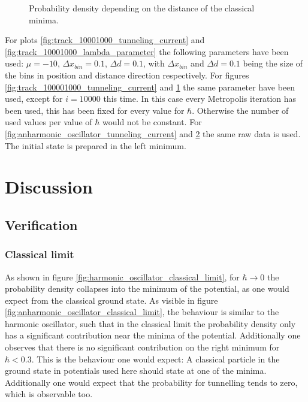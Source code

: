 \documentclass{scrartcl}
\begin{document}
\begin{figure}[H]
\begin{subfigure}[c]{0.49\textwidth}
					\label{fig:track_100001000_lambda_parameter}
				\end{subfigure}
			\caption{Probability density depending on the distance of the classical minima.}
			\label{fig:anharmonic_oscillator_lambda_parameter}
		\end{figure}
		For plots \ref{fig:track_10001000_tunneling_current} and \ref{fig:track_10001000_lambda_parameter} the following parameters have been used: $\mu = -10$, $\Delta x_{bin} = 0.1$, $\Delta d = 0.1$, with $\Delta x_{bin}$ and $\Delta d = 0.1$ being the size of the bins in position and distance direction respectively.
		For figures \ref{fig:track_100001000_tunneling_current} and \ref{fig:track_100001000_lambda_parameter} the same parameter have been used, except for $i = 10000$ this time.
		In this case every  Metropolis iteration has been used, this has been fixed for every value for $\hbar$.
		Otherwise the number of used values per value of $\hbar$ would not be constant.
		For \ref{fig:anharmonic_oscillator_tunneling_current} and \ref{fig:anharmonic_oscillator_lambda_parameter} the same raw data is used.
		The initial state is prepared in the left minimum.

	\section{Discussion}
	\subsection{Verification}
	\subsubsection{Classical limit}
		As shown in figure \ref{fig:harmonic_oscillator_classical_limit}, for $\hbar \rightarrow 0$ the probability density collapses into the minimum of the potential, as one would expect from the classical ground state.
		As visible in figure \ref{fig:anharmonic_oscillator_classical_limit}, the behaviour is similar to the harmonic oscillator, such that in the classical limit the probability density only has a significant contribution near the minima of the potential.
		Additionally one observes that there is no significant contribution on the right minimum for $\hbar < 0.3$.
		This is the behaviour one would expect:
		A classical particle in the ground state in potentials used here should state at one of the minima.
		Additionally one would expect that the probability for tunnelling tends to zero, which is observable too.
\end{document}
